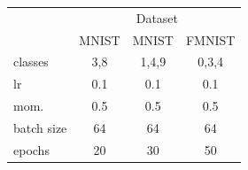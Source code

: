 \begin{table}[h]
\begin{minipage}{0.45\linewidth}
		\begin{tabular}{l |c c c}
			\toprule
			\multicolumn{1}{c}{} & \multicolumn{3}{|c}{Dataset}\\
			\cline{2-4}
			\multicolumn{1}{c}{ }&\multicolumn{1}{|c}{MNIST}  & \multicolumn{1}{c}{MNIST}  & \multicolumn{1}{c}{FMNIST} \\
			\midrule
			{\tiny classes} & 3,8 & 1,4,9 & 0,3,4\\ 
			lr &  0.1 & 0.1 & 0.1\\
			mom. &   0.5& 0.5& 0.5\\
			{\tiny batch size} &  64& 64&64\\
			epochs &  20 & 30 & 50 \\
			\bottomrule
		\end{tabular}
	\end{minipage}
\end{table}

\newpage

